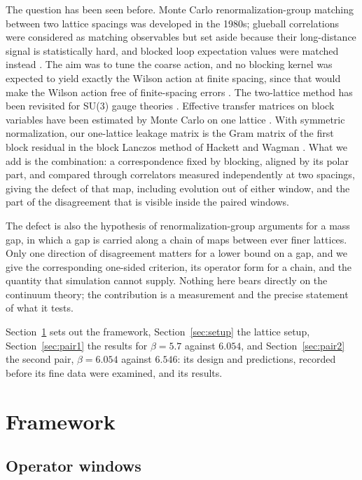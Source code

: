 \documentclass[11pt]{article}
\begin{document}
The question has been seen before. Monte Carlo renormalization-group matching between two lattice
spacings was developed in the 1980s; glueball correlations were considered as matching observables but
set aside because their long-distance signal is statistically hard, and blocked loop expectation values
were matched instead \cite{Mackenzie1984,Swendsen1981}. The aim was to tune the coarse action, and no
blocking kernel was expected to yield exactly the Wilson action at finite spacing, since that would make
the Wilson action free of finite-spacing errors \cite{Mackenzie1984}. The two-lattice method has been
revisited for SU(3) gauge theories \cite{Hasenfratz2009}. Effective transfer matrices on block variables
have been estimated by Monte Carlo on one lattice \cite{HPR1994}. With symmetric normalization, our
one-lattice leakage matrix is the Gram matrix of the first block residual in the block Lanczos method of
Hackett and Wagman \cite{HackettWagman2025}. What we add is the combination: a correspondence fixed by
blocking, aligned by its polar part, and compared through correlators measured independently at two
spacings, giving the defect of that map, including evolution out of either window, and the part of the
disagreement that is visible inside the paired windows.

The defect is also the hypothesis of renormalization-group arguments for a mass gap, in which a gap is
carried along a chain of maps between ever finer lattices. Only one direction of disagreement matters
for a lower bound on a gap, and we give the corresponding one-sided criterion, its operator form for a
chain, and the quantity that simulation cannot supply. Nothing here bears directly on the continuum
theory; the contribution is a measurement and the precise statement of what it tests.

Section~\ref{sec:framework} sets out the framework, Section~\ref{sec:setup} the lattice setup,
Section~\ref{sec:pair1} the results for $\beta=5.7$ against $6.054$, and Section~\ref{sec:pair2} the second
pair, $\beta=6.054$ against $6.546$: its design and predictions, recorded before its fine data were
examined, and its results.

\section{Framework}\label{sec:framework}

\subsection{Operator windows}
\end{document}
